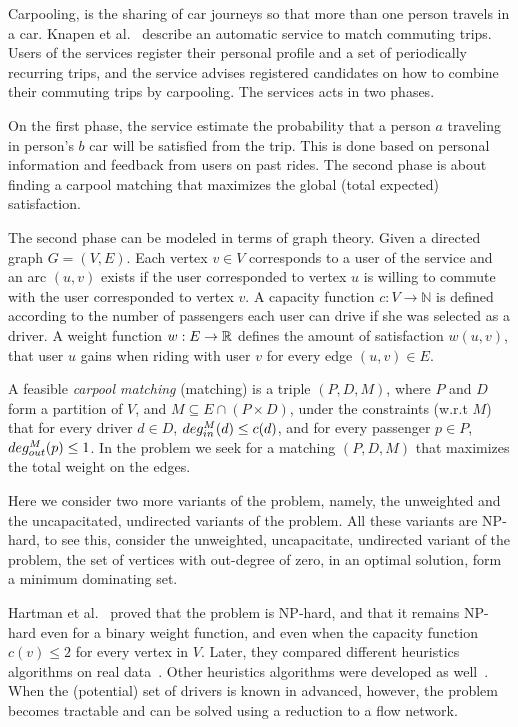 Carpooling, is the sharing of car journeys so that more than one person travels
in a car.
Knapen et al.~\cite{knapen2013estimating} describe an automatic service
to match commuting trips.
Users of the services register their personal profile and a set of periodically
recurring trips, 
and the service advises registered candidates on how to combine their commuting
trips by carpooling.
The services acts in two phases. 

On the first phase, the service estimate the probability that a person $a$
traveling in person's $b$ car will be satisfied from the trip.
This is done based on personal information and feedback from users on past
rides.
The second phase is about finding a carpool matching
that maximizes the global (total expected) satisfaction.

The second phase can be modeled in terms of graph theory.
Given a directed graph $G = (V, E)$.
Each vertex $v \in V$ corresponds to a user of the service and an arc
$(u, v)$ exists if the user corresponded to vertex $u$ is willing to
commute with the user corresponded to vertex $v$.
A capacity function $ c: V \rightarrow \mathbb{N} $ is defined
according to the number of passengers each user can drive if she was
selected as a driver.
A weight function $w : E \rightarrow \mathbb{R} $ defines the amount of
satisfaction $w(u, v)$,
that user $u$ gains when riding with user $v$ for every edge $(u, v) \in E$.

A feasible \emph{carpool matching} (matching) is a triple 
$(P, D, M)$, where $P$ and $D$ form a partition of $V$, and 
$M \subseteq E \cap (P \times D)$,
under the constraints (w.r.t $M$) that for every driver $d \in D$, 
$deg^M_{in}(d) \leq c(d)$, 
and for every passenger $p \in P$, $deg^M_{out}(p) \leq 1$.
In the \textsc{\CARPOOL{}} problem we seek for a matching $(P, D, M)$ that maximizes the
total weight on the edges.

Here we consider two more variants of the problem, namely, 
the unweighted and the uncapacitated, undirected variants of the problem.
All these variants are NP-hard, to see this, 
consider the unweighted, uncapacitate, undirected variant of the problem, 
the set of vertices with out-degree of zero, in an optimal solution, 
form a minimum dominating set.  
  
Hartman et al.~\cite{hartman2013optimal} proved that the \emph{\CARPOOL{}} problem is
NP-hard, and that it remains NP-hard even for a binary weight function, and even when
the capacity function $c(v) \leq 2$ for every vertex in $V$.
Later, they compared different heuristics algorithms on real data~\cite{hartman2014theory}.
Other heuristics algorithms were developed as well~\cite{knapen2014exploiting}.
When the (potential) set of drivers is known in advanced, however, the problem becomes
tractable and can be solved using a reduction to a flow network.

